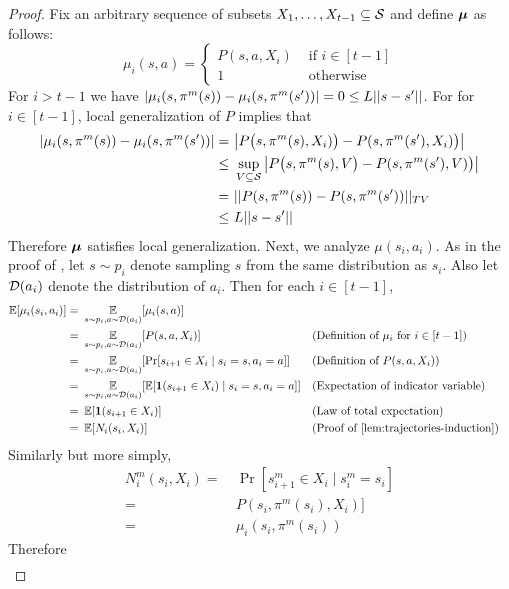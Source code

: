 \lemTraj*

\begin{proof}
Fix an arbitrary sequence of subsets $X_1,\dots,X_{t-1} \subseteq \mathcal{S}$ and define $\boldsymbol{\mu}$ as follows:
\[
\mu_i(s,a) =
\begin{cases}
P(s,a,X_i) & \text{ if } i \in [t-1]\\
1 & \text{ otherwise}
\end{cases}
\]
For $i > t-1$ we have $|\mu_i(s, \pi^m(s)) - \mu_i(s, \pi^m(s'))| = 0 \le L||s - s'||$. For for $i \in [t-1]$, local generalization of $P$ implies that
\begin{align*}
|\mu_i(s, \pi^m(s)) - \mu_i(s, \pi^m(s'))| =&\ \big|P\big(s,\pi^m(s), X_i)\big) - P(s,\pi^m(s'),X_i)\big)\big|\\
\le&\ \sup_{V \subseteq \s}\big|P\big(s,\pi^m(s), V\big) - P(s,\pi^m(s'),V)\big)\big|\\
=&\ \tv{P(s, \pi^m(s)) - P(s, \pi^m(s'))}\\
\le&\ L \norm{s-s'}
\end{align*}
Therefore $\boldsymbol{\mu}$ satisfies local generalization. Next, we analyze $\mu(s_i, a_i)$. As in the proof of , let $s \sim p_i$ denote sampling $s$ from the same distribution as $s_i$. Also let $\mathcal{D}(a_i)$ denote the distribution of $a_i$. Then for each $i \in [t-1]$,
\begin{align*}
\E[\mu_i(s_i, a_i)] =&\ \E_{s\sim p_i, a\sim \D(a_i)}[\mu_i(s, a)]\\
=&\ \E_{s\sim p_i, a\sim \D(a_i)}[P(s,a,X_i)] && (\text{Definition of $\mu_i$ for $i \in [t-1]$})\\
=&\ \E_{s\sim p_i, a\sim \D(a_i)}[\Pr[s_{i+1} \in X_i \mid s_i = s, a_i = a]] && (\text{Definition of $P(s,a,X_i)$})\\
=&\ \E_{s\sim p_i, a\sim \D(a_i)}[\E[\bfone(s_{i+1} \in X_i) \mid s_i = s, a_i = a]] && (\text{Expectation of indicator variable})\\
=&\ \E[\bfone(s_{i+1} \in X_i)] && (\text{Law of total expectation})\\
=&\ \E[N_i(s_i, X_i)] && (\text{Proof of \Cref{lem:trajectories-induction}})
\end{align*}
Similarly but more simply,
\begin{align*}
N_i^m(s_i,X_i)=&\ \Pr[s_{i+1}^m \in X_i \mid s_i^m = s_i]\\
=&\ P(s_i, \pi^m(s_i), X_i)]\\
=&\ \mu_i(s_i, \pi^m(s_i))
\end{align*}
Therefore
\begin{align*}

\end{align*}
\end{proof}
